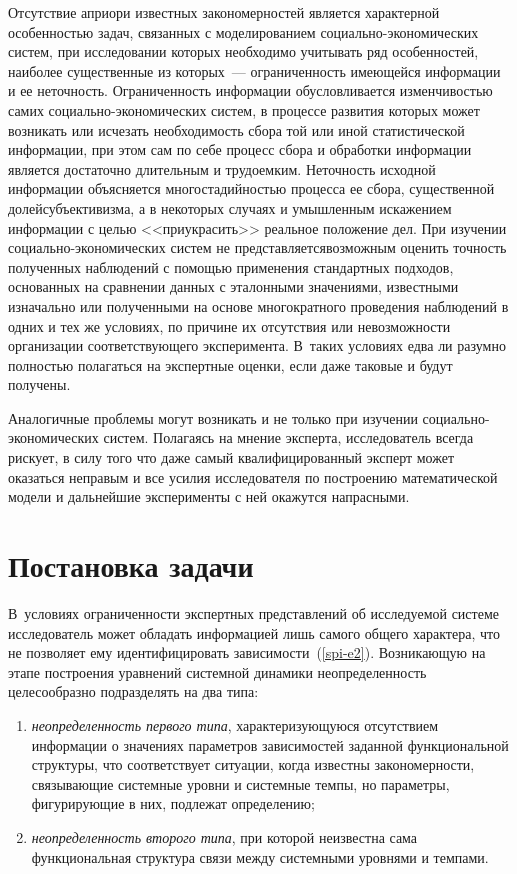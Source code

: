 {\begin{multicols}{2}
  Отсутствие априори известных закономерностей является характерной
особенностью задач,\linebreak
 связанных с моделированием со\-ци\-аль\-но-эко\-но\-мических
систем, при исследовании которых необходимо учитывать ряд особенностей,
наиболее существен\-ные из которых~--- ограниченность имеющейся
информации и ее неточность. Ограниченность информации обусловливается
изменчивостью самих со\-ци\-аль\-но-эко\-но\-ми\-че\-ских систем, в процессе
развития которых может возникать или исчезать необходимость сбора той или
иной статистической информации, при этом сам по себе процесс сбора и
обработки информации является достаточно длительным и трудоемким.
Неточность исходной информации объясняется многостадийностью процесса
ее сбора, существенной долей\linebreak субъективизма, а в некоторых случаях и
умышлен\-ным искажением информации с целью <<приукрасить>> реальное
положение дел. При изучении  со\-ци\-аль\-но-эко\-но\-ми\-че\-ских
систем не
пред\-став\-ля\-ет\-ся\linebreak возможным оценить точность полученных наблюдений с
помощью применения стандартных подходов, основанных на сравнении
данных с эталон\-ными значениями, известными изначально или получен\-ными
на основе многократного проведения наблюдений в одних и тех же условиях,
по причине их отсутствия или невозможности организации соответствующего
эксперимента. В~таких условиях едва ли разумно полностью полагаться на
экспертные оценки, если даже таковые и будут получены.



  Аналогичные проблемы могут возникать и не только при изучении
 со\-ци\-аль\-но-эко\-но\-ми\-че\-ских систем. Полагаясь на мнение эксперта,
исследователь всегда рискует, в силу того что даже самый квалифицированный
эксперт может оказаться неправым и все усилия исследователя по построению
математической модели и дальнейшие эксперименты с ней окажутся
напрасными.

\section{Постановка задачи} %

  В~условиях ограниченности экспертных представлений об исследуемой
системе исследователь может обладать информацией лишь самого общего
характера, что не позволяет ему идентифицировать зависимости~(\ref{spi-e2}).
Возникающую на этапе по\-стро\-ения уравнений системной динамики
неопределенность целесообразно подразделять на два типа:
  \begin{enumerate}[(1)]
\item \textit{неопределенность первого типа}, характери\-зу\-ющу\-юся отсутствием
информации о значениях параметров зависимостей заданной функциональной
структуры, что соответствует ситуа\-ции, когда известны закономерности,
связывающие системные уровни и системные темпы, но параметры,
фигурирующие в них, подлежат определению;
\item \textit{неопределенность второго типа}, при которой неизвестна сама
функциональная структура связи между системными уровнями и тем\-пами.
\end{enumerate}


\end{multicols}}
